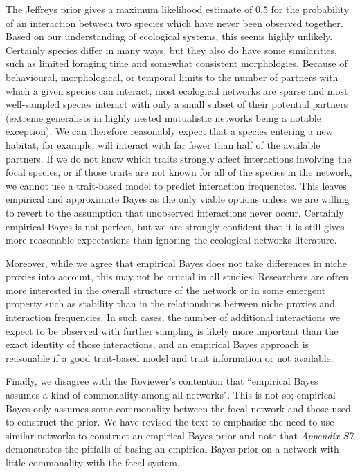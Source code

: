 \documentclass[12pt]{letter}
\begin{document}
		The Jeffreys prior gives a maximum likelihood estimate of 0.5 for the probability of an interaction between two species which have never been observed together. Based on our understanding of ecological systems, this seems highly unlikely. Certainly species differ in many ways, but they also do have some similarities, such as limited foraging time and somewhat consistent morphologies. Because of behavioural, morphological, or temporal limits to the number of partners with which a given species can interact, most ecological networks are sparse and most well-sampled species interact with only a small subset of their potential partners (extreme generalists in highly nested mutualistic networks being a notable exception). We can therefore reasonably expect that a species entering a new habitat, for example, will interact with far fewer than half of the available partners. If we do not know which traits strongly affect interactions involving the focal species, or if those traits are not known for all of the species in the network, we cannot use a trait-based model to predict interaction frequencies. This leaves empirical and approximate Bayes as the only viable options unless we are willing to revert to the assumption that unobserved interactions never occur. Certainly empirical Bayes is not perfect, but we are strongly confident that it is still gives more reasonable expectations than ignoring the ecological networks literature.


		Moreover, while we agree that empirical Bayes does not take differences in niche proxies into account, this may not be crucial in all studies. Researchers are often more interested in the overall structure of the network or in some emergent property such as stability than in the relationships between niche proxies and interaction frequencies. In such cases, the number of additional interactions we expect to be observed with further sampling is likely more important than the exact identity of those interactions, and an empirical Bayes approach is reasonable if a good trait-based model and trait information or not available. 


		Finally, we disagree with the Reviewer's contention that ``empirical Bayes assumes a kind of commonality among all networks". This is not so; empirical Bayes only assumes some commonality between the focal network and those used to construct the prior. We have revised the text to emphasise the need to use similar networks to construct an empirical Bayes prior and note that \emph{Appendix S7} demonstrates the pitfalls of basing an empirical Bayes prior on a network with little commonality with the focal system. 
\end{document}
